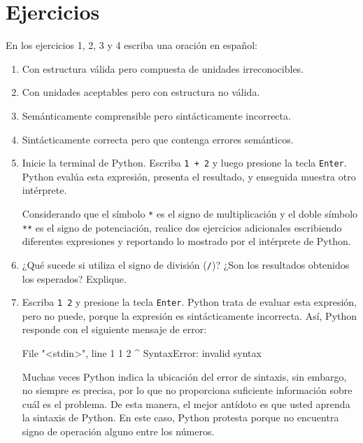 \section{Ejercicios}

En los ejercicios 1, 2, 3 y 4 escriba una oración en español:

\begin{enumerate}

\item Con estructura válida pero compuesta de unidades irreconocibles.

	\item Con unidades aceptables pero con estructura no válida.
	
	\item Semánticamente comprensible pero sintácticamente incorrecta. 
	
	\item Sintácticamente correcta pero que contenga errores semánticos.
	
	\item Inicie la terminal de Python. Escriba \texttt{1 + 2} y luego presione 
	la tecla \texttt{Enter}. 
	Python evalúa esta expresión, presenta el resultado, y enseguida muestra
	otro intérprete.
	 
	Considerando que el símbolo \texttt{*} es el signo de multiplicación y el
	doble símbolo \texttt{**} es el signo de potenciación, realice dos
	ejercicios adicionales escribiendo diferentes expresiones 
	y reportando lo mostrado por el intérprete de Python. 
	
	\item ¿Qué sucede si utiliza el signo de división (\texttt{/})? 
	¿Son los resultados obtenidos los esperados? Explique.
	
	\item Escriba \texttt{1 2} y presione la tecla \texttt{Enter}. Python trata
	de evaluar esta expresión, pero no puede, porque la expresión es 
	sintácticamente incorrecta. Así, Python responde 
	con el siguiente mensaje de error:

	\begin{pyconcode}
File "<stdin>", line 1
 1 2
   ^
SyntaxError: invalid syntax
	\end{pyconcode}

	Muchas veces Python indica la ubicación del error de sintaxis, sin embargo, 
	no siempre es precisa, por lo que no proporciona suficiente información
	sobre cuál es el problema. De esta manera, el mejor antídoto es que usted
	aprenda la sintaxis de Python. 
	En este caso, Python protesta porque no encuentra signo de operación alguno
	entre los números.


\end{enumerate}
